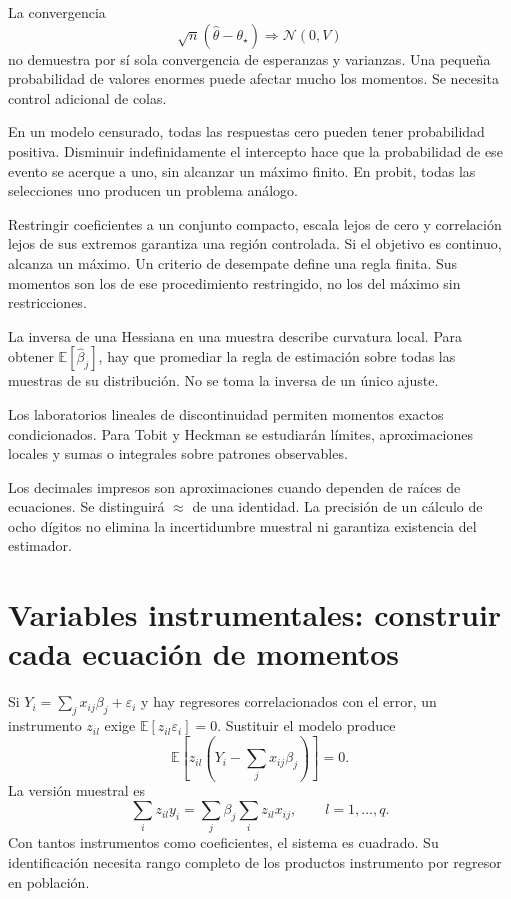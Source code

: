 \documentclass[11pt,a4paper]{article}
\newcommand{\E}{\mathbb E}
\begin{document}
La convergencia
\[
\sqrt n(\widehat\theta-\theta_\star)
\Rightarrow\mathcal N(0,V)
\]
no demuestra por sí sola convergencia de
esperanzas y varianzas.
Una pequeña probabilidad de valores enormes
puede afectar mucho los momentos.
Se necesita control adicional de colas.

En un modelo censurado, todas las respuestas cero
pueden tener probabilidad positiva.
Disminuir indefinidamente el intercepto hace
que la probabilidad de ese evento se acerque a uno,
sin alcanzar un máximo finito.
En probit, todas las selecciones uno
producen un problema análogo.

Restringir coeficientes a un conjunto compacto,
escala lejos de cero y correlación lejos
de sus extremos garantiza una región controlada.
Si el objetivo es continuo, alcanza un máximo.
Un criterio de desempate define una regla finita.
Sus momentos son los de ese procedimiento
restringido, no los del máximo sin restricciones.

\begin{ejemplo}
La inversa de una Hessiana en una muestra
describe curvatura local.
Para obtener \(\E[\widehat\beta_j]\),
hay que promediar la regla de estimación
sobre todas las muestras de su distribución.
No se toma la inversa de un único ajuste.
\end{ejemplo}
Los laboratorios lineales de discontinuidad
permiten momentos exactos condicionados.
Para Tobit y Heckman se estudiarán
límites, aproximaciones locales y sumas
o integrales sobre patrones observables.

Los decimales impresos son aproximaciones
cuando dependen de raíces de ecuaciones.
Se distinguirá \(\approx\) de una identidad.
La precisión de un cálculo de ocho dígitos
no elimina la incertidumbre muestral
ni garantiza existencia del estimador.

\clearpage
\section{Variables instrumentales: construir cada ecuación de momentos}\label{unidad16}
Si
\(Y_i=\sum_jx_{ij}\beta_j+\varepsilon_i\)
y hay regresores correlacionados con el error,
un instrumento \(z_{il}\) exige
\(\E[z_{il}\varepsilon_i]=0\).
Sustituir el modelo produce
\[
\E\left[z_{il}\left(Y_i-\sum_jx_{ij}\beta_j\right)\right]=0.
\]
La versión muestral es
\[
\sum_i z_{il}y_i
=\sum_j\beta_j\sum_i z_{il}x_{ij},
\qquad l=1,\ldots,q.
\]
Con tantos instrumentos como coeficientes,
el sistema es cuadrado. Su identificación
necesita rango completo de los productos
instrumento por regresor en población.
\end{document}

